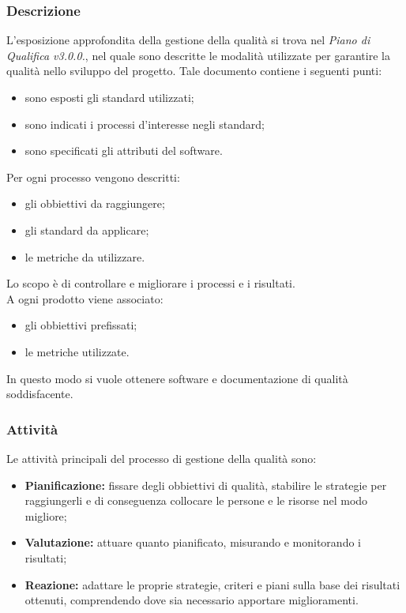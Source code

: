 \subsubsection{Descrizione}
L'esposizione approfondita della gestione della qualità si trova nel \textit{Piano di Qualifica v3.0.0.}, nel quale sono descritte le modalità utilizzate per garantire la qualità nello sviluppo del progetto. Tale documento contiene i seguenti punti:
\begin{itemize}
    \item sono esposti gli standard utilizzati;
    \item sono indicati i processi d'interesse negli standard;
    \item sono specificati gli attributi del software.
\end{itemize}
Per ogni processo vengono descritti:
\begin{itemize}
    \item gli obbiettivi da raggiungere;
    \item gli standard da applicare;
    \item le metriche da utilizzare.
\end{itemize}
Lo scopo è di controllare e migliorare i processi e i risultati. \\
A ogni prodotto viene associato:
\begin{itemize}
    \item gli obbiettivi prefissati;
    \item le metriche utilizzate.
\end{itemize}
In questo modo si vuole ottenere software e documentazione di qualità soddisfacente.
\subsubsection{Attività}
Le attività principali del processo di gestione della qualità sono:
\begin{itemize}
    \item \textbf{Pianificazione:} fissare degli obbiettivi di qualità, stabilire le strategie per raggiungerli e di conseguenza collocare le persone e le risorse nel modo migliore;
    \item \textbf{Valutazione:} attuare quanto pianificato, misurando e monitorando i risultati;
    \item \textbf{Reazione:} adattare le proprie strategie, criteri e piani sulla base dei risultati ottenuti, comprendendo dove sia necessario apportare miglioramenti.
\end{itemize}
